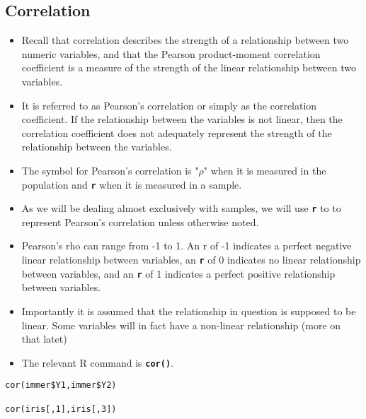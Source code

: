 \subsection{Correlation}
\begin{itemize}
\item Recall that correlation describes the strength of a relationship between two numeric variables, and that the Pearson product-moment correlation coefficient is a measure of the strength of the linear relationship between two variables.

\item It is referred to as Pearson's correlation or simply as the correlation coefficient. If the relationship between the variables is not linear, then the correlation coefficient does not adequately represent the strength of the relationship between the variables.

\item The symbol for Pearson's correlation is "$\rho$" when it is measured in the population and \texttt{\textbf{r}} when it is measured in a sample.

\item As we will be dealing almost exclusively with samples, we will use \texttt{\textbf{r}} to to represent Pearson's correlation unless otherwise noted.

\item 
Pearson's rho can range from -1 to 1. An r of -1 indicates a perfect negative linear relationship between variables, an \texttt{\textbf{r}} of 0 indicates no linear relationship between variables, and an \texttt{\textbf{r}} of 1 indicates a perfect positive relationship between variables.

\item Importantly it is assumed that the relationship in question is supposed to be linear. Some variables will in fact have a non-linear relationship (more on that latet)
\item 
The relevant R command is \texttt{\textbf{cor()}}.
\end{itemize}

\begin{framed}
\begin{verbatim}
cor(immer$Y1,immer$Y2)

cor(iris[,1],iris[,3])
\end{verbatim}
\end{framed}

